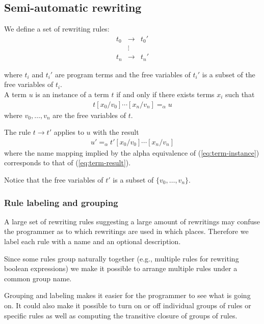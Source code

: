 \subsection{Semi-automatic rewriting}
We define a set of rewriting rules:
\begin{eqnarray*}
t_0 &\rightarrow& t_0'\\
&\vdots&\\
t_n &\rightarrow& t_n'
\end{eqnarray*}

where $t_i$ and $t_i'$ are program terms and the free variables of $t_i'$ is a subset of the free
variables of $t_i$.
\\

A term $u$ is an instance of a term $t$ if and only if there exists terms $x_i$ such that
\begin{eqnarray}\label{eq:term-instance}
t[x_0 / v_0] \cdots [x_n / v_n] =_{\alpha} u
\end{eqnarray}
where $v_0, \ldots, v_n$ are the free variables of $t$.

The rule $t \rightarrow t'$ applies to $u$ with the result
\begin{eqnarray}\label{eq:term-result}
u' =_{\alpha} t'[x_0 / v_0] \cdots [x_n / v_n]
\end{eqnarray}
where the name mapping implied by the alpha equivalence of (\ref{eq:term-instance}) corresponds to
that of (\ref{eq:term-result}).

Notice that the free variables of $t'$ is a subset of $\{v_0, \ldots, v_n\}$.

\subsubsection{Rule labeling and grouping}
A large set of rewriting rules suggesting a large amount of rewritings may confuse the programmer as
to which rewritings are used in which places. Therefore we label each rule with a name and an
optional description.

Since some rules group naturally together (e.g., multiple rules for rewriting boolean expressions)
we make it possible to arrange multiple rules under a common group name.

Grouping and labeling makes it easier for the programmer to see what is going on. It could also make
it possible to turn on or off individual groups of rules or specific rules as well as computing the
transitive closure of groups of rules.
